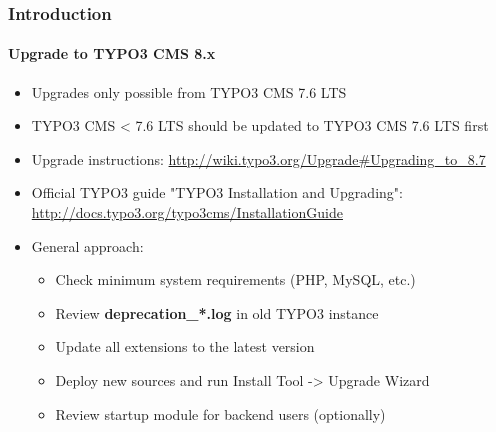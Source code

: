 \begin{frame}[fragile]
	\frametitle{Introduction}
	\framesubtitle{Upgrade to TYPO3 CMS 8.x}

	\begin{itemize}
		\item Upgrades only possible from TYPO3 CMS 7.6 LTS
		\item TYPO3 CMS < 7.6 LTS should be updated to TYPO3 CMS 7.6 LTS first
	\end{itemize}

	\begin{itemize}

		\item Upgrade instructions:\newline
			\smaller\url{http://wiki.typo3.org/Upgrade#Upgrading_to_8.7}\normalsize
		\item Official TYPO3 guide "TYPO3 Installation and Upgrading":
			\smaller\url{http://docs.typo3.org/typo3cms/InstallationGuide}\normalsize
		\item General approach:
			\begin{itemize}
				\item Check minimum system requirements \small(PHP, MySQL, etc.)
				\item Review \textbf{deprecation\_*.log} in old TYPO3 instance
				\item Update all extensions to the latest version
				\item Deploy new sources and run Install Tool -> Upgrade Wizard
				\item Review startup module for backend users (optionally)
			\end{itemize}
	\end{itemize}

\end{frame}


